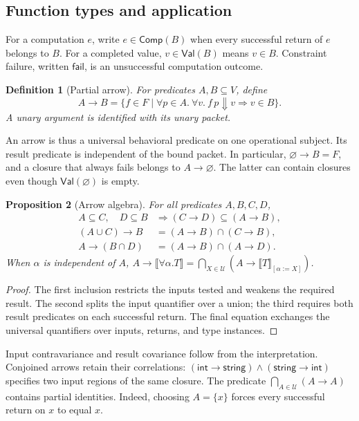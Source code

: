 \documentclass[10pt,a4paper]{article}
\newcommand{\sem}[1]{\llbracket #1\rrbracket}
\newcommand{\U}{\mathcal U}
\newcommand{\Comp}{\mathsf{Comp}}
\newcommand{\Val}{\mathsf{Val}}
\newcommand{\Fail}{\mathsf{fail}}
\newcommand{\Int}{\mathsf{int}}
\newcommand{\Str}{\mathsf{string}}
\newtheorem{definition}{Definition}[section]
\newtheorem{proposition}[definition]{Proposition}
\theoremstyle{remark}
\begin{document}
\subsection{Function types and application}
For a computation $e$, write $e\in\Comp(B)$ when every successful return of
$e$ belongs to $B$. For a completed value, $v\in\Val(B)$ means $v\in B$.
Constraint failure, written $\Fail$, is an unsuccessful computation outcome.

\begin{definition}[Partial arrow]\label{def:arrow}
For predicates $A,B\subseteq V$, define
\begin{equation}\label{eq:arrow}
 A\to B=\{f\in F\mid\forall p\in A.\ \forall v.\
                 f\,p\Downarrow v\Longrightarrow v\in B\}.
\end{equation}
A unary argument is identified with its unary packet.
\end{definition}

An arrow is thus a universal behavioral predicate on one operational subject.
Its result predicate is independent of the bound packet. In particular,
$\varnothing\to B=F$, and a closure that always fails belongs to
$A\to\varnothing$. The latter can contain closures even though
$\Val(\varnothing)$ is empty.

\begin{proposition}[Arrow algebra]\label{prop:arrows}
For all predicates $A,B,C,D$,
\begin{align*}
 A\subseteq C,\quad D\subseteq B
     &\Longrightarrow (C\to D)\subseteq(A\to B),\\
 (A\cup C)\to B&=(A\to B)\cap(C\to B),\\
 A\to(B\cap D)&=(A\to B)\cap(A\to D).
\end{align*}
When $\alpha$ is independent of $A$,
$A\to\sem{\forall\alpha.T}
 =\bigcap_{X\in\U}(A\to\sem T_{[\alpha:=X]})$.
\end{proposition}
\begin{proof}
The first inclusion restricts the inputs tested and weakens the required result.
The second splits the input quantifier over a union; the third requires both
result predicates on each successful return. The final equation exchanges the
universal quantifiers over inputs, returns, and type instances.
\end{proof}

Input contravariance and result covariance follow from the interpretation.
Conjoined arrows retain their correlations: $(\Int\to\Str)\land
(\Str\to\Int)$ specifies two input regions of the same closure. The predicate
$\bigcap_{A\in\U}(A\to A)$ contains partial identities. Indeed, choosing
$A=\{x\}$ forces every successful return on $x$ to equal $x$.
\end{document}
